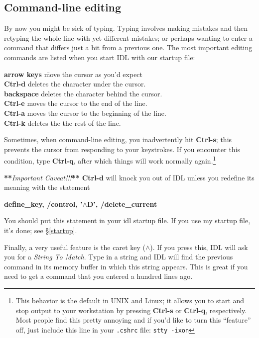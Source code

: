 \documentclass[psfig,preprint]{aastex}
\begin{document}

\subsection {Command-line editing}

       By now you might be sick of typing.  Typing involves making
mistakes and then retyping the whole line with yet different mistakes;
or perhaps wanting to enter a command that differs just a bit from a
previous one.  The most important editing commands are listed when you
start IDL with our startup file:

\begin {tabbing}
{\bf arrow keys} \hspace{0.8in} \= move the cursor as you'd expect \\
{\bf Ctrl-d} \> deletes the character under the cursor. \\
{\bf backspace} \> deletes the character behind the cursor. \\
{\bf Ctrl-e} \> moves the cursor to the end of the line. \\
{\bf Ctrl-a} \> moves the cursor to the beginning of the line. \\
{\bf Ctrl-k} \> deletes the the rest of the line.
\end{tabbing}

\noindent Sometimes, when command-line editing, you inadvertently hit {\bf
  Ctrl-s}; this prevents the cursor from responding to your keystrokes. If
you encounter this condition, type {\bf Ctrl-q}, after which things will
work normally again.\footnote{This behavior is the default in UNIX and
  Linux; it allows you to start and stop output to your workstation by
  pressing {\bf Ctrl-s} or {\bf Ctrl-q}, respectively. Most people find
  this pretty annoying and if you'd like to turn this ``feature'' off,
  just include this line in your {\tt .cshrc} file: {\tt stty -ixon} }

	{\bf ***}{\it Important Caveat!!!}{\bf ***} {\bf Ctrl-d} will
knock you out of IDL unless you redefine its meaning with the statement

\noindent \textbf{define\_key, /control, '$\wedge$D', /delete\_current}

\noindent You should put this statement in your idl startup file.  If
you use my startup file, it's done; see \S \ref{startup}.

Finally, a very useful feature is the caret key ($\wedge$).  If you press
this, IDL will ask you for a {\it String To Match}.  Type in a string and
IDL will find the previous command in its memory buffer in which this
string appears.  This is great if you need to get a command that you
entered a hundred lines ago.
\end{document}
